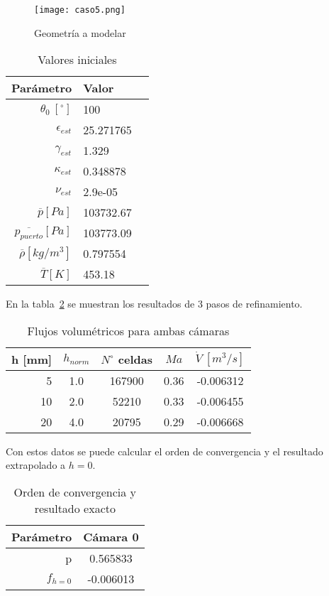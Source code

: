 \begin{figure}
    \centering
    \texttt{[image: caso5.png]}
    \caption{Geometría a modelar}\label{fig:caso5}
\end{figure}

\begin{table}
    \centering
    \begin{tabular}{rll}\toprule
        Parámetro & Valor \\ \midrule
        $\theta_0\ [^{\circ}]$ & 100 \\
        $\epsilon_{est}$ & 25.271765 \\
        $\gamma_{est}$ & 1.329 \\
        $\kappa_{est}$ & 0.348878 \\
        $\nu_{est}$ & 2.9e-05 \\
        $\overline{p} [Pa]$ & 103732.67 \\
        $\overline{p_{puerto}} [Pa]$ & 103773.09 \\
        $\overline{\rho} [kg/m^3]$ & 0.797554 \\
        $\overline{T} [K]$ & 453.18 \\ \bottomrule
    \end{tabular}
    \caption{Valores iniciales}\label{tab:caso5_ci}
\end{table}

En la tabla~\ref{tab:res_caso5} se muestran los resultados de 3 pasos de
refinamiento.

\begin{table}[h]
    \centering
    \begin{tabular}{rcccc}\toprule
        h [mm] & $h_{norm}$ & $N^{\circ}$ celdas & $Ma$ & $\dot{V}\ [m^3/s]$ \\ \midrule
        5      & 1.0        & 167900             & 0.36 & -0.006312 \\
        10     & 2.0        & 52210              & 0.33 & -0.006455 \\
        20     & 4.0        & 20795              & 0.29 & -0.006668 \\ \bottomrule
    \end{tabular}
    \caption{Flujos volumétricos para ambas cámaras}\label{tab:res_caso5}
\end{table}

Con estos datos se puede calcular el orden de convergencia y el resultado
extrapolado a $h=0$.

\begin{table}[h]
    \centering
    \begin{tabular}{rc}\toprule
        Parámetro & Cámara 0  \\ \midrule
        p         &  0.565833 \\
        $f_{h=0}$ & -0.006013 \\ \bottomrule
    \end{tabular}
    \caption{Orden de convergencia y resultado exacto}\label{tab:res1_caso5}
\end{table}

